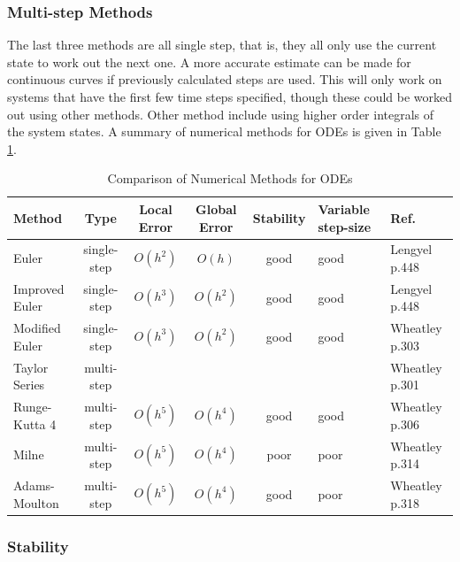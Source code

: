 \documentclass[a4paper,oneside,12pt]{report}
\begin{document}
\subsubsection{Multi-step Methods}

The last three methods are all single step, that is, they all only use the current state to work out the next one. A more accurate estimate can be made for continuous curves if previously calculated steps are used. This will only work on systems that have the first few time steps specified, though these could be worked out using other methods. Other method include using higher order integrals of the system states. A summary of numerical methods for ODEs is given in Table \ref{tbl_numericalmethods}.

\begin{table}
\caption{Comparison of Numerical Methods for ODEs}
\begin{center}
\begin{tabular}{|l|c|c|c|c|p{2cm}|l|}
\hline
\textbf{Method} & \textbf{Type} & \textbf{Local Error} & \textbf{Global Error} & \textbf{Stability} & \textbf{Variable step-size} & \textbf{Ref.} \\ \hline
Euler                     & single-step & $O(h^2)$ & $O(h)$   & good & good & Lengyel p.448  \\ \hline
Improved Euler            & single-step & $O(h^3)$ & $O(h^2)$ & good & good & Lengyel p.448  \\ \hline
Modified Euler            & single-step & $O(h^3)$ & $O(h^2)$ & good & good & Wheatley p.303 \\ \hline
Taylor Series             & multi-step  &          &          &      &      & Wheatley p.301 \\ \hline
Runge-Kutta 4  & multi-step  & $O(h^5)$ & $O(h^4)$ & good & good & Wheatley p.306 \\ \hline
Milne                     & multi-step  & $O(h^5)$ & $O(h^4)$ & poor & poor & Wheatley p.314 \\ \hline
Adams-Moulton             & multi-step  & $O(h^5)$ & $O(h^4)$ & good & poor & Wheatley p.318 \\ \hline
\end{tabular}
\end{center}
\label{tbl_numericalmethods}
\end{table}


\subsubsection{Stability}
\end{document}
